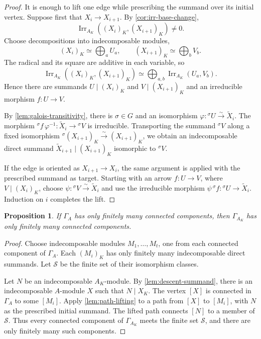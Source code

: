 \documentclass[11pt,letterpaper,reqno]{amsart}
\newtheorem{proposition}[proposition]{Proposition}
\theoremstyle{definition}
\DeclareMathOperator{\Irr}{Irr}
\begin{document}
\begin{proof}
It is enough to lift one edge while prescribing the summand over its initial
vertex.  Suppose first that $X_i\longrightarrow X_{i+1}$.  By
\cref{cor:irr-base-change},
\[
\Irr_{A_K}((X_i)_K,(X_{i+1})_K)\neq0.
\]
Choose decompositions into indecomposable modules,
\[
(X_i)_K\simeq\bigoplus_aU_a,
\qquad
(X_{i+1})_K\simeq\bigoplus_bV_b.
\]
The radical and its square are additive in each variable, so
\[
\Irr_{A_K}((X_i)_K,(X_{i+1})_K)
 \simeq\bigoplus_{a,b}\Irr_{A_K}(U_a,V_b).
\]
Hence there are summands $U\mid(X_i)_K$ and
$V\mid(X_{i+1})_K$ and an irreducible morphism $f:U\to V$.

By \cref{lem:galois-transitivity}, there is $\sigma\in G$ and an
isomorphism $\varphi:{}^\sigma U\xrightarrow{\sim}\widetilde X_i$. The morphism ${}^\sigma f\,\varphi^{-1}: \widetilde X_i\longrightarrow{}^\sigma V$ is irreducible.  
Transporting the summand ${}^\sigma V$ along a fixed isomorphism \({}^\sigma(X_{i+1})_K\xrightarrow{\sim}(X_{i+1})_K\), we obtain an indecomposable direct summand
$\widetilde X_{i+1}\mid(X_{i+1})_K$ isomorphic to ${}^\sigma V$.

If the edge is oriented as $X_{i+1}\longrightarrow X_i$, the same argument is applied with the prescribed summand as target.  Starting with an arrow $f:U\to V$, where $V\mid(X_i)_K$, choose $\psi:{}^\sigma V\xrightarrow{\sim}\widetilde X_i$ and use the irreducible morphism $\psi\,{}^\sigma f:{}^\sigma U\longrightarrow\widetilde X_i$. Induction on $i$ completes the lift.
\end{proof}

\begin{proposition}\label{prop:components-base-change}
If $\Gamma_A$ has only finitely many connected components, then
$\Gamma_{A_K}$ has only finitely many connected components.
\end{proposition}

\begin{proof}
Choose indecomposable modules $M_1,\ldots,M_t$, one from each connected
component of $\Gamma_A$.  Each $(M_i)_K$ has only finitely many
indecomposable direct summands.  Let $\mathcal S$ be the finite set of their
isomorphism classes.

Let $N$ be an indecomposable $A_K$-module.  By
\cref{lem:descent-summand}, there is an indecomposable $A$-module $X$ such
that $N\mid X_K$.  The vertex $[X]$ is connected in $\Gamma_A$ to some
$[M_i]$.  Apply \cref{lem:path-lifting} to a path from $[X]$ to $[M_i]$,
with $N$ as the prescribed initial summand.  The lifted path connects $[N]$
to a member of $\mathcal S$.  Thus every connected component of
$\Gamma_{A_K}$ meets the finite set $\mathcal S$, and there are only
finitely many such components.
\end{proof}
\end{document}
